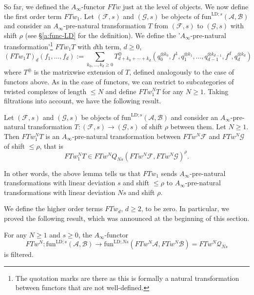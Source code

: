So far, we defined the $A_\infty$-functor $FTw$ just at the level of objects. We now define the first order term $FTw_1$. Let $(\mathcal{F},s)$ and $(\mathcal{G},s)$ be objects of $\text{fun}^{\text{LD};s}(\mathcal{A}, \mathcal{B})$ and consider an $A_\infty$-pre-natural transformation $T$ from $(\mathcal{F},s)$ to $(\mathcal{G},s)$ with shift $\rho$ (see \S\ref{a:func-LD} for the definition). We define the '$A_\infty$-pre-natural transformation'\footnote{The quotation marks are there as this is formally a natural transformation between functors that are not well-defined.} $FTw_1T$ with $d$th term, $d\geq 0$, $$(FTw_1T)_d(f_1,\ldots, f_d):= \sum_{k_0,\ldots, k_d\geq 0}T^\oplus_{d+k_0+\cdots + k_d}\left(q_0^{\otimes k_0}, f^1,q_1^{\otimes k_1},\ldots, q_{d-1}^{\otimes k_{d-1}},f^d, q_d^{\otimes k_d}\right)$$ where $T^\oplus$ is the matrixwise extension of $T$, defined analogously to the case of functors above. As in the case of functors, we can restrict to subcategories of twisted complexes of length $\leq N$ and define $FTw_1^NT$ for any $N\geq 1$. Taking filtrations into account, we have the following result.
\begin{lem}
	Let $(\mathcal{F},s)$ and $(\mathcal{G},s)$ be objects of $\text{fun}^{\text{LD};s}(\mathcal{A}, \mathcal{B})$ and consider an $A_\infty$-pre-natural transformation $T\colon (\mathcal{F},s)\to(\mathcal{G},s)$ of shift $\rho$ between them. Let $N\geq 1$. Then $FTw^N_1T$ is an $A_\infty$-pre-natural transformation between $FTw^N\mathcal{F}$ and $FTw^N\mathcal{G}$ of shift $\leq \rho$, that is $$FTw^N_1T\in FTw^NQ_{Ns}(FTw^N\mathcal{F},FTw^N\mathcal{G})^\rho.$$
\end{lem}
\begin{rem}
	In other words, the above lemma tells us that $FTw_1$ sends $A_\infty$-pre-natural transformations with linear deviation $s$ and shift $\leq \rho$ to $A_\infty$-pre-natural transformations with linear deviation $Ns$ and shift $\rho$.
\end{rem}
We define the higher order terms $FTw_d$, $d\geq 2$, to be zero. In particular, we proved the following result, which was announced at the beginning of this section.
\begin{cor}
	For any $N\geq 1$ and $s\geq 0$, the $A_\infty$-functor $$FTw^N\colon \text{fun}^{\text{LD};s}(\mathcal{A}, \mathcal{B})\to \text{fun}^{\text{LD};Ns}(FTw^N\mathcal{A},FTw^N\mathcal{B}) = FTw^N\mathcal{Q}_{Ns}$$ is filtered.
\end{cor} 

